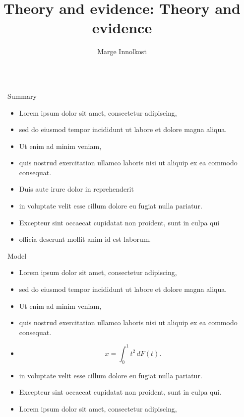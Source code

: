 \documentclass[12pt, final]{beamer}
\title{Theory and evidence: Theory and evidence}
\author{Marge Innolkost}
\newlength{\sepwid}
\newlength{\onecolwid}
\begin{document}
\begin{frame}[t]
  \begin{columns}[t]
    \begin{column}{\sepwid}\end{column} %
    \begin{column}{\onecolwid}
      \begin{block}{Summary}
        \begin{itemize}
          \item Lorem ipsum \alert{dolor} sit amet, consectetur adipiscing,
          \item sed do eiusmod tempor incididunt ut labore et dolore magna aliqua.
          \item Ut enim ad minim veniam,
          \item quis nostrud exercitation ullamco laboris nisi ut aliquip ex ea commodo consequat.
          \item Duis aute irure dolor in reprehenderit
          \item in voluptate velit \alert{esse cillum dolore} eu fugiat nulla pariatur.
          \item Excepteur sint occaecat cupidatat non proident, sunt in culpa qui
          \item officia deserunt mollit anim id est laborum.
        \end{itemize}
      \end{block}
      \begin{block}{Model}
        \begin{itemize}
          \item Lorem ipsum \alert{dolor} sit amet, consectetur adipiscing,
          \item sed do eiusmod tempor incididunt ut labore et dolore magna aliqua.
          \item Ut enim ad minim veniam,
          \item quis nostrud exercitation ullamco laboris nisi ut aliquip ex ea commodo consequat.
          \item $$x = \int_0^1 t^2 \,dF(t).$$
          \item in voluptate velit \alert{esse cillum dolore} eu fugiat nulla pariatur.
          \item Excepteur sint occaecat cupidatat non proident, sunt in culpa qui.
          \item Lorem ipsum \alert{dolor} sit amet, consectetur adipiscing,

\end{itemize}
\end{block}
\end{column}
\end{columns}
\end{frame}
\end{document}
